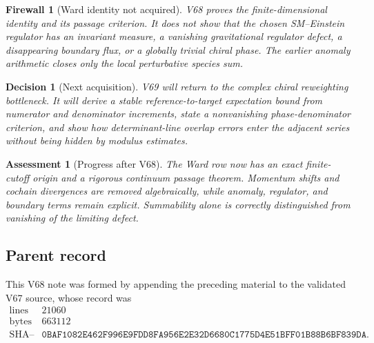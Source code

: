 \documentclass[11pt]{article}
\newtheorem{assessment}[theorem]{Assessment}
\newtheorem{firewall}[theorem]{Firewall}
\newtheorem{decision}[theorem]{Decision}
\begin{document}
\begin{firewall}[Ward identity not acquired]
\label{fire:v11v68-boundary}
V68 proves the finite-dimensional identity and its passage criterion.
It does not show that the chosen SM--Einstein regulator has an invariant
measure, a vanishing gravitational regulator defect, a disappearing
boundary flux, or a globally trivial chiral phase.  The earlier anomaly
arithmetic closes only the local perturbative species sum.
\end{firewall}

\begin{decision}[Next acquisition]
\label{dec:v11v68-next}
V69 will return to the complex chiral reweighting bottleneck.  It will
derive a stable reference-to-target expectation bound from numerator
and denominator increments, state a nonvanishing phase-denominator
criterion, and show how determinant-line overlap errors enter the
adjacent series without being hidden by modulus estimates.
\end{decision}

\begin{assessment}[Progress after V68]
\label{ass:v11v68-status}
The Ward row now has an exact finite-cutoff origin and a rigorous
continuum passage theorem.  Momentum shifts and cochain divergences are
removed algebraically, while anomaly, regulator, and boundary terms
remain explicit.  Summability alone is correctly distinguished from
vanishing of the limiting defect.
\end{assessment}

\subsection{Parent record}

This V68 note was formed by appending the preceding material to the
validated V67 source, whose record was
\[
\begin{array}{c|c}
\text{lines}&21060\\
\text{bytes}&663112\\
\text{SHA--256}&
\texttt{0BAF1082E462F996E9FDD8FA956E2E32D6680C1775D4E51BFF01B88B6BF839DA}.
\end{array}                                                     \tag{68.17}
\]

\end{document}
